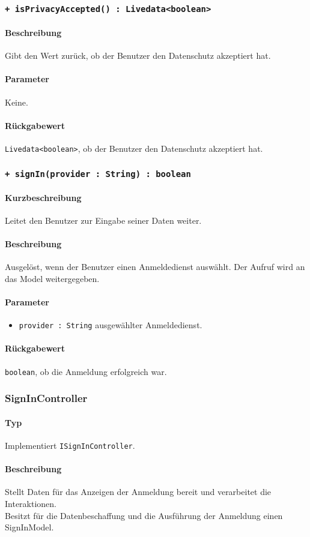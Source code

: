 \subsubsection{\texttt{+ isPrivacyAccepted() : Livedata<boolean>}}%
\paragraph*{Beschreibung}
Gibt den Wert zurück, ob der Benutzer den Datenschutz akzeptiert hat.
\paragraph*{Parameter}
Keine.
\paragraph*{Rückgabewert}
\texttt{Livedata<boolean>}, ob der Benutzer den Datenschutz akzeptiert hat.

\subsubsection{\texttt{+ signIn(provider : String) : boolean}}%
\paragraph*{Kurzbeschreibung}
Leitet den Benutzer zur Eingabe seiner Daten weiter.
\paragraph*{Beschreibung}
Ausgelöst, wenn der Benutzer einen Anmeldedienst auswählt. 
Der Aufruf wird an das Model weitergegeben.
\paragraph*{Parameter}
\begin{itemize}
    \item \texttt{provider : String} ausgewählter Anmeldedienst.
\end{itemize}
\paragraph*{Rückgabewert}
\texttt{boolean}, ob die Anmeldung erfolgreich war.

\subsubsection{SignInController}
\paragraph*{Typ}
Implementiert \texttt{ISignInController}.
\paragraph*{Beschreibung}
Stellt Daten für das Anzeigen der Anmeldung bereit und verarbeitet die Interaktionen.\\
Besitzt für die Datenbeschaffung und die Ausführung der Anmeldung einen SignInModel.

